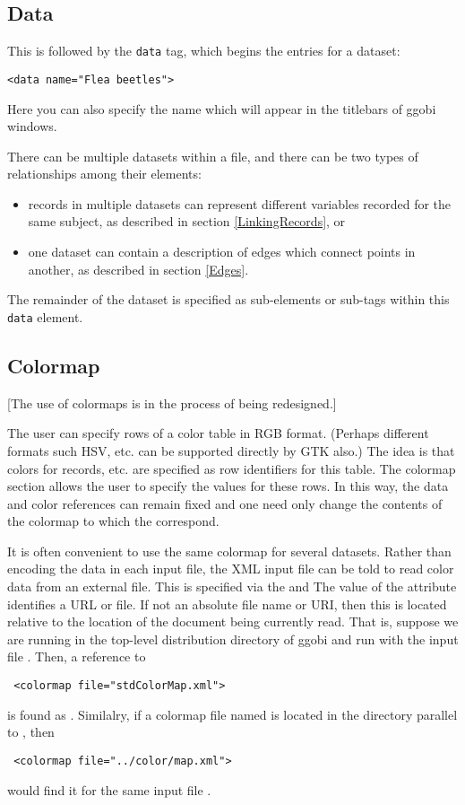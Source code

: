 \documentclass{article}
\def\XMLAttribute#1{\Escape{#1}}
\begin{document}
\subsection{Data}

This is followed by the \texttt{data} tag, which begins the
entries for a dataset:

\begin{verbatim}
<data name="Flea beetles">
\end{verbatim}
%
Here you can also specify the name which will appear in the titlebars
of ggobi windows.

There can be multiple datasets within a file, and there can be two
types of relationships among their elements: 
\begin{itemize}
\item records in multiple datasets can represent different variables
  recorded for the same subject, as described in section
  \ref{LinkingRecords}, or
\item one dataset can contain a description of edges which connect
  points in another, as described in section \ref{Edges}.
\end{itemize}

The remainder of the dataset is specified as sub-elements or sub-tags
within this \texttt{data} element.

\subsection{Colormap}

[The use of colormaps is in the process of being redesigned.]

The user can specify rows of a color table in RGB format.  (Perhaps
different formats such HSV, etc. can be supported directly by GTK
also.)  The idea is that colors for records, etc.  are specified as
row identifiers for this table.  The colormap section allows the user
to specify the values for these rows.  In this way, the data and color
references can remain fixed and one need only change the contents of
the colormap to which the correspond.

It is often convenient to use the same colormap for several
datasets. Rather than encoding the data in each input file, the XML
input file can be told to read color data from an external file.  This
is specified via the \XMLAttribute{file} and \XMLAttribute{type} The
value of the \XMLAttribute{file} attribute identifies a URL or
file. If not an absolute file name or URI, then this is located
relative to the location of the document being currently read.
That is, suppose we are running in the top-level distribution
directory of ggobi and run with the input file .
Then, a reference to 
\begin{verbatim}
 <colormap file="stdColorMap.xml">
\end{verbatim}
is found as .  Similalry, if a colormap
file named  is located in the directory 
parallel to , then
\begin{verbatim}
 <colormap file="../color/map.xml">
\end{verbatim}
would find it for the same input file .
\end{document}
